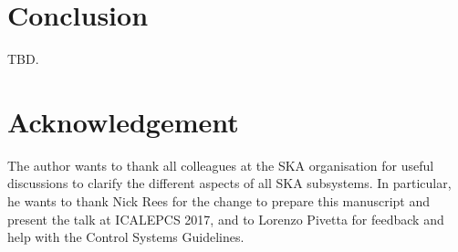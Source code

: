 \documentclass[a4paper,
               biblatex,       %
               keeplastbox,    %
               ]{jacow-2_1}    %
\begin{document}

\section{Conclusion} %
\label{sec:conclusion}
TBD.


\section{Acknowledgement} %
\label{sec:acknowledgement}
The author wants to thank all colleagues at the SKA organisation for useful discussions to clarify the different aspects of all SKA subsystems. In particular, he wants to thank Nick Rees for the change to prepare this manuscript and present the talk at ICALEPCS 2017, and to Lorenzo Pivetta for feedback and help with the Control Systems Guidelines.


\label{sec:references}
\printbibliography

\end{document}
